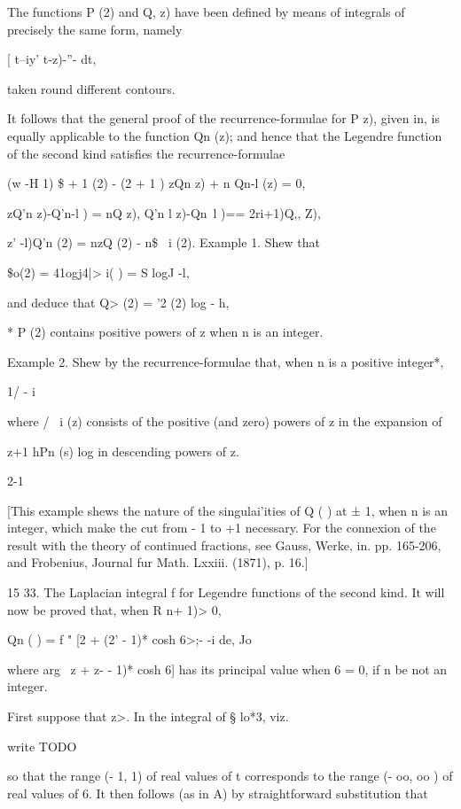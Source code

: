 {{The functions P (2) and Q, z) have been defined by means of integrals
of precisely the same form, namely

[ t--iy' t-z)-''- dt,

taken round different contours.

It follows that the general proof of the recurrence-formulae for P z),
given in, is equally applicable to the function Qn (z); and
hence that the Legendre function of the second kind satisfies the
recurrence-formulae

(w -H 1) \$ + 1 (2) - (2 + 1 ) zQn z) + n Qn-l (z) = 0,

zQ'n z)-Q'n-l ) = nQ z), Q'n l z)-Qn~l )== 2ri+1)Q,, Z),

 z' -l)Q'n (2) = nzQ (2) - n\$ \ i (2). Example 1. Shew that

\$o(2) = 41ogj4|> i( ) = S logJ -l,

and deduce that Q> (2) = '2 (2) log - h,

* P (2) contains positive powers of z when n is an integer.

%
%

Example 2. Shew by the recurrence-formulae that, when n is a positive
integer*,

 1/ - i

where / \ i (z) consists of the positive (and zero) powers of z in the
expansion of

z+1 hPn (s) log in descending powers of z.

2-1

[This example shews the nature of the singulai'ities of Q ( ) at ± 1,
when n is an integer, which make the cut from - 1 to +1 necessary. For
the connexion of the result with the theory of continued fractions,
see Gauss, Werke, in. pp. 165-206, and Frobenius, Journal fur Math.
Lxxiii. (1871), p. 16.]

15 33. The Laplacian integral f for Legendre functions of the second
kind. It will now be proved that, when R n+ 1)> 0,

Qn ( ) = f " [2 + (2' - 1)* cosh 6>;- -i de, Jo

where arg \ z + z- - 1)* cosh 6] has its principal value when 6 = 0,
if n be not an integer.

First suppose that z>. In the integral of § lo*3, viz.

write TODO

so that the range (- 1, 1) of real values of t corresponds to the
range (- oo, oo ) of real values of 6. It then follows (as in
A) by straightforward substitution that

}}
